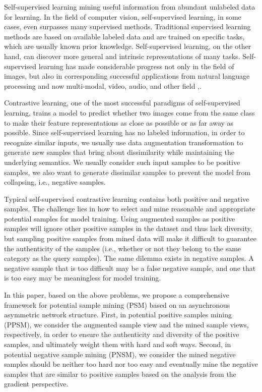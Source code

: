 \documentclass[review]{elsarticle}
\begin{document}
Self-supervised learning mining useful information from abundant unlabeled data for learning. In the field of computer vision, self-supervised learning, in some cases, even surpasses many supervised methods. Traditional supervised learning methods are based on available labeled data and are trained on specific tasks, which are usually known prior knowledge. Self-supervised learning, on the other hand, can discover more general and intrinsic representations of many tasks. Self-supervised learning has made considerable progress not only in the field of images, but also in corresponding successful applications from natural language processing and now multi-modal, video, audio, and other field \cite{b25,b26,b1,b2,new2,new3},.

Contrastive learning, one of the most successful paradigms of self-supervised learning, trains a model to predict whether two images come from the same class to make their feature representations as close as possible or as far away as possible. Since self-supervised learning has no labeled information, in order to recognize similar inputs, we usually use data augmentation transformation to generate new samples that bring about dissimilarity while maintaining the underlying semantics. We usually consider such input samples to be positive samples, we also want to generate dissimilar samples to prevent the model from collapsing, i.e., negative samples.

Typical self-supervised contrastive learning contains both positive and negative samples. The challenge lies in how to select and mine reasonable and appropriate potential samples for model training. Using augmented samples as positive samples will ignore other positive samples in the dataset and thus lack diversity, but sampling positive samples from mined data will make it difficult to guarantee the authenticity of the samples (i.e., whether or not they belong to the same category as the query samples). The same dilemma exists in negative samples. A negative sample that is too difficult may be a false negative sample, and one that is too easy may be meaningless for model training.


In this paper, based on the above problems, we propose a comprehensive framework for potential sample mining (PSM) based on an asynchronous asymmetric network structure. First, in potential positive samples mining (PPSM), we consider the augmented sample view and the mined sample views, respectively, in order to ensure the authenticity and diversity of the positive samples, and ultimately weight them with hard and soft ways. Second, in potential negative sample mining (PNSM), we consider the mined negative samples should be neither too hard nor too easy and eventually mine the negative samples that are similar to positive samples based on the analysis from the gradient perspective.
\end{document}

